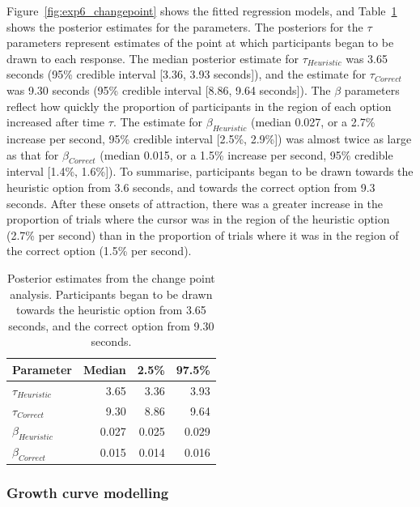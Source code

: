 Figure~\ref{fig:exp6_changepoint} shows the fitted regression models,
and Table~\ref{tbl:exp6_changepoint} shows the posterior estimates for the parameters.
The posteriors for the $\tau$ parameters represent
estimates of the point at which participants began to be drawn to each response.
The median posterior estimate for $\tau_{Heuristic}$ was
3.65 seconds (95\% credible interval [3.36, 3.93 seconds]),
and the estimate for $\tau_{Correct}$ was
9.30 seconds (95\% credible interval [8.86, 9.64 seconds]).
The $\beta$ parameters reflect how quickly
the proportion of participants in the region of each option increased after time $\tau$.
The estimate for $\beta_{Heuristic}$
(median 0.027, or a 2.7\% increase per second,
95\% credible interval [2.5\%, 2.9\%])
was almost twice as large as that for $\beta_{Correct}$
(median 0.015, or a 1.5\% increase per second,
95\% credible interval [1.4\%, 1.6\%]).
To summarise, participants began to be drawn towards
the heuristic option from 3.6 seconds,
and towards the correct option from 9.3 seconds.
After these onsets of attraction,
there was a greater increase in the proportion of trials
where the cursor was in the region of the heuristic option (2.7\% per second)
than in the proportion of trials
where it was in the region of the correct option (1.5\% per second).


\begin{table}
  \centering
  \caption[Bayesian change point analysis, Experiment 6.]{
    Posterior estimates from the change point analysis.
    Participants began to be drawn towards the heuristic option
    from 3.65 seconds, and the correct option from 9.30 seconds.
    \label{tbl:exp6_changepoint}
  }
  \begin{tabular}{lrrr}
    \toprule
    Parameter           & Median & 2.5\% & 97.5\%\\
    \midrule
    $\tau_{Heuristic}$  & 3.65  & 3.36 & 3.93\\
    $\tau_{Correct}$    & 9.30  & 8.86 & 9.64\\
    \midrule
    $\beta_{Heuristic}$ & 0.027  & 0.025 & 0.029\\
    $\beta_{Correct}$   & 0.015  & 0.014 & 0.016\\
    \bottomrule
  \end{tabular}
\end{table}



\subsubsection{Growth curve modelling}

